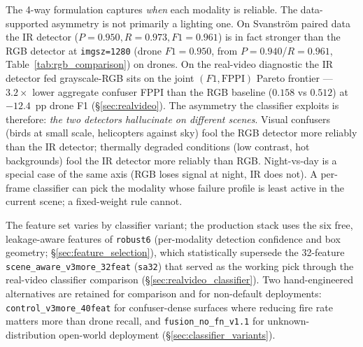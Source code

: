 \documentclass[12pt,a4paper,oneside,openright]{book}
\begin{document}
The 4-way formulation captures \emph{when} each modality is reliable. The data-supported asymmetry is not primarily a lighting one. On Svanstr\"om paired data the IR detector ($P=0.950, R=0.973, F1=0.961$) is in fact stronger than the RGB detector at \texttt{imgsz=1280} (drone $F1=0.950$, from $P=0.940$/$R=0.961$, Table~\ref{tab:rgb_comparison}) on drones. On the real-video diagnostic the IR detector fed grayscale-RGB sits on the joint $(F1, \mathrm{FPPI})$ Pareto frontier --- $3.2\times$ lower aggregate confuser FPPI than the RGB baseline ($0.158$ vs $0.512$) at $-12.4$~pp drone F1 (\S\ref{sec:realvideo}). The asymmetry the classifier exploits is therefore: \emph{the two detectors hallucinate on different scenes}. Visual confusers (birds at small scale, helicopters against sky) fool the RGB detector more reliably than the IR detector; thermally degraded conditions (low contrast, hot backgrounds) fool the IR detector more reliably than RGB. Night-vs-day is a special case of the same axis (RGB loses signal at night, IR does not). A per-frame classifier can pick the modality whose failure profile is least active in the current scene; a fixed-weight rule cannot.

The feature set varies by classifier variant; the production stack uses the six free, leakage-aware features of \texttt{robust6} (per-modality detection confidence and box geometry; \S\ref{sec:feature_selection}), which statistically supersede the 32-feature \texttt{scene\_aware\_v3more\_32feat} (\texttt{sa32}) that served as the working pick through the real-video classifier comparison (\S\ref{sec:realvideo_classifier}). Two hand-engineered alternatives are retained for comparison and for non-default deployments: \texttt{control\_v3more\_40feat} for confuser-dense surfaces where reducing fire rate matters more than drone recall, and \texttt{fusion\_no\_fn\_v1.1} for unknown-distribution open-world deployment (\S\ref{sec:classifier_variants}).
\end{document}
